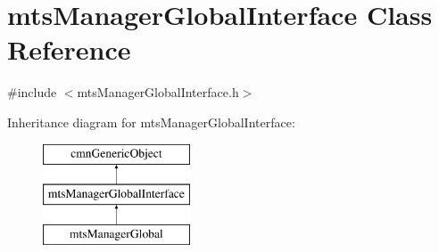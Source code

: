 \hypertarget{classmts_manager_global_interface}{}\section{mts\+Manager\+Global\+Interface Class Reference}
\label{classmts_manager_global_interface}


{\ttfamily \#include $<$mts\+Manager\+Global\+Interface.\+h$>$}

Inheritance diagram for mts\+Manager\+Global\+Interface\+:\begin{figure}[H]
\begin{center}
\leavevmode
\includegraphics[height=3.000000cm]{df/de3/classmts_manager_global_interface}
\end{center}
\end{figure}
